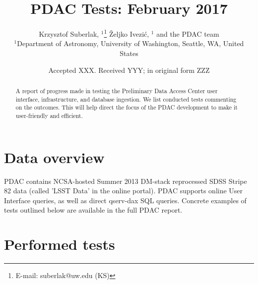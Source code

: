 \documentclass[fleqn,usenatbib, onecolumn]{mnras} %
\title[PDAC progress]{PDAC Tests: February 2017}
\author[K. Suberlak et al. ]{
Krzysztof Suberlak, $^{1}$\thanks{E-mail: suberlak@uw.edu (KS)}
\v{Z}eljko Ivezi\'c, $^{1}$ and the PDAC team  
\\
$^{1}$Department of Astronomy, University of Washington, Seattle, WA, United States\\
}
\date{Accepted XXX. Received YYY; in original form ZZZ}
\begin{document}
\label{firstpage}
\pagerange{\pageref{firstpage}--\pageref{lastpage}}
\maketitle

\begin{abstract}
A report of progress made in testing the Preliminary Data Access Center user interface, infrastructure, and database ingestion.  We list conducted tests commenting on the outcomes. This will help direct the focus of the PDAC development to make it user-friendly and efficient. 
\end{abstract}




\section*{Data overview}
PDAC contains NCSA-hosted Summer 2013 DM-stack reprocessed SDSS Stripe 82 data (called 'LSST Data' in the online portal). PDAC supports online User Interface queries, as well as direct  qserv-dax SQL queries. Concrete examples of tests outlined below are available in the full PDAC report.  

\section*{Performed tests}
\end{document}
